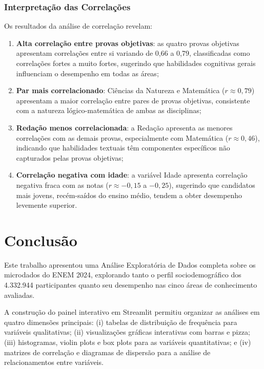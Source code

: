 \documentclass[
    12pt,
    oneside,
    a4paper,
    chapter=TITLE,
    section=TITLE
]{abntex2}
\begin{document}
\subsection{Interpretação das Correlações}

Os resultados da análise de correlação revelam:

\begin{enumerate}
    \item \textbf{Alta correlação entre provas objetivas}: as quatro provas objetivas
    apresentam correlações entre si variando de 0,66 a 0,79, classificadas como
    correlações fortes a muito fortes, sugerindo que habilidades cognitivas gerais
    influenciam o desempenho em todas as áreas;

    \item \textbf{Par mais correlacionado}: Ciências da Natureza e Matemática
    ($r \approx 0{,}79$) apresentam a maior correlação entre pares de provas objetivas,
    consistente com a natureza lógico-matemática de ambas as disciplinas;

    \item \textbf{Redação menos correlacionada}: a Redação apresenta as menores
    correlações com as demais provas, especialmente com Matemática ($r \approx 0{,}46$),
    indicando que habilidades textuais têm componentes específicos não capturados
    pelas provas objetivas;

    \item \textbf{Correlação negativa com idade}: a variável Idade apresenta correlação
    negativa fraca com as notas ($r \approx -0{,}15$ a $-0{,}25$), sugerindo que
    candidatos mais jovens, recém-saídos do ensino médio, tendem a obter desempenho
    levemente superior.
\end{enumerate}

\chapter{Conclusão}

Este trabalho apresentou uma Análise Exploratória de Dados completa sobre os microdados do
ENEM 2024, explorando tanto o perfil sociodemográfico dos 4.332.944 participantes quanto seu
desempenho nas cinco áreas de conhecimento avaliadas.

A construção do painel interativo em Streamlit permitiu organizar as análises em quatro
dimensões principais: (i) tabelas de distribuição de frequência para variáveis qualitativas;
(ii) visualizações gráficas interativas com barras e pizza; (iii) histogramas, violin plots
e box plots para as variáveis quantitativas; e (iv) matrizes de correlação e diagramas de
dispersão para a análise de relacionamentos entre variáveis.
\end{document}

